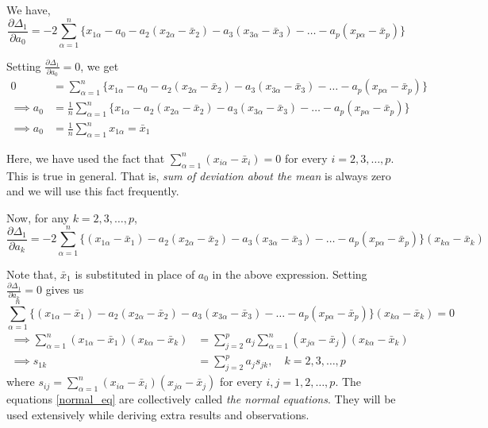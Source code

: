 \documentclass[10pt]{article}
\begin{document}
We have,
\[
\frac{\partial \Delta_{1}}{\partial a_0} = -2 \sum_{\alpha = 1}^{n} \{ x_{1\alpha} - a_0 - a_2 \left( x_{2\alpha} - \bar{x}_2 \right) - a_3 \left( x_{3\alpha} - \bar{x}_3 \right) - \ldots - a_p \left( x_{p\alpha} - \bar{x}_p \right) \}
\]

Setting $ \frac{\partial \Delta_1}{\partial a_0} = 0 $, we get
\begin{align}
	0 &= \sum_{\alpha = 1}^{n} \{ x_{1\alpha} - a_0 - a_2 \left( x_{2\alpha} - \bar{x}_2 \right) - a_3 \left( x_{3\alpha} - \bar{x}_3 \right) - \ldots - a_p \left( x_{p\alpha} - \bar{x}_p \right) \} \nonumber \\
	\implies a_0 &= \frac{ 1 }{ n } \sum_{\alpha = 1}^{n} \{x_{1\alpha} - a_2 \left( x_{2\alpha} - \bar{x}_2 \right) - a_3 \left( x_{3\alpha} - \bar{x}_3 \right) - \ldots - a_p \left( x_{p\alpha} - \bar{x}_p \right) \} \nonumber \\
	\implies a_0 &= \frac{ 1 }{ n } \sum_{\alpha = 1}^{n} x_{1\alpha} = \bar{x}_1 
\end{align}

Here, we have used the fact that $\sum_{\alpha = 1}^{n} \left( x_{i\alpha} - \bar{x}_i \right) = 0$ for every $i = 2, 3, \ldots, p$. 
This is true in general. That is, \textit{sum of deviation about the mean} is always zero and we will use this fact frequently.

Now, for any $ k = 2, 3, \ldots, p $,
$$ \frac{\partial \Delta_{1}}{\partial a_k} = -2 \sum_{\alpha = 1}^{n} \{ \left(x_{1\alpha} - \bar{x}_1\right) - a_2 \left( x_{2\alpha} - \bar{x}_2 \right) - a_3 \left( x_{3\alpha} - \bar{x}_3 \right) - \ldots - a_p \left( x_{p\alpha} - \bar{x}_p \right) \} \left( x_{k\alpha} - \bar{x}_k \right) $$

Note that, \( \bar{x}_{1} \) is substituted in place of \( a_{0} \) in the above expression.
Setting $ \frac{\partial \Delta_1}{\partial a_k} = 0 $ gives us
\[    \sum_{\alpha = 1}^{n}\{ \left(x_{1\alpha} - \bar{x}_1\right) - a_2 \left( x_{2\alpha} - \bar{x}_2 \right) - a_3 \left( x_{3\alpha} - \bar{x}_3 \right) - \ldots - a_p \left( x_{p\alpha} - \bar{x}_p \right) \} \left( x_{k\alpha} - \bar{x}_k \right) = 0 \]
\begin{align}
	\implies \sum_{\alpha = 1}^{n} \left( x_{1\alpha} - \bar{x}_1 \right) \left( x_{k\alpha} - \bar{x}_k \right) &= \sum_{j=2}^{p}a_j \sum_{\alpha = 1}^{n} \left( x_{j\alpha} - \bar{x}_j \right) \left( x_{k\alpha} - \bar{x}_k \right) \nonumber \\
	\implies s_{1k} &= \sum_{j=2}^{p} a_js_{jk}, \quad k = 2, 3, \ldots, p \label{normal_eq}
\end{align}
where $ s_{ij} = \sum_{\alpha = 1}^{n} \left( x_{i\alpha} - \bar{x}_i \right) \left( x_{j\alpha} - \bar{x}_j \right) $ for every $ i, j = 1, 2, \ldots, p$.
The equations \eqref{normal_eq} are collectively called \textit{the normal equations}. 
They will be used extensively while deriving extra results and observations.
\end{document}
